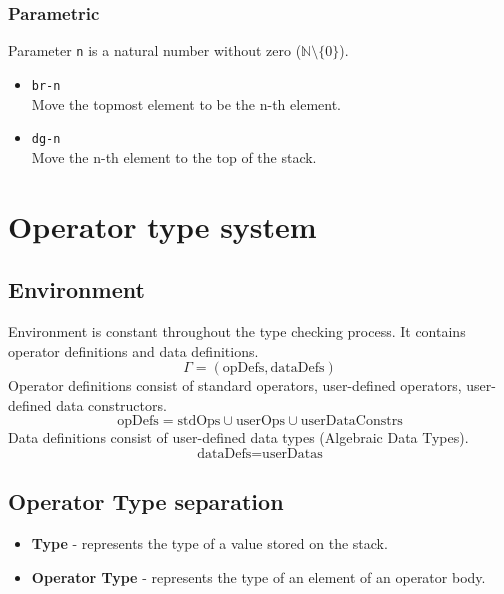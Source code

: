 \documentclass{article}
\begin{document}
\subsubsection*{Parametric}
Parameter \texttt{n} is a natural number without zero ($\mathbb{N}
\setminus \{ 0 \}$).
\begin{itemize}
  \item \texttt{br-n} \\
    Move the topmost element to be the n-th element.
  \item \texttt{dg-n} \\
    Move the n-th element to the top of the stack.
\end{itemize}

\section*{Operator type system}

\subsection*{Environment}
Environment is constant throughout the type checking process. It
contains operator definitions and data definitions.
\begin{equation*}
  \Gamma = (\text{opDefs}, \text{dataDefs})
\end{equation*}
Operator definitions consist of standard operators, user-defined
operators, user-defined data constructors.
\begin{equation*}
  \text{opDefs} = \text{stdOps} \cup \text{userOps} \cup \text{userDataConstrs}
\end{equation*}
Data definitions consist of user-defined data types (Algebraic Data Types).
\begin{equation*}
  \text{dataDefs} = \text{userDatas}
\end{equation*}

\subsection*{Operator Type separation}
\begin{itemize}
  \item \textbf{Type} - represents the type of a value stored on the stack.
  \item \textbf{Operator Type} - represents the type of an element of
    an operator body.
\end{itemize}
\end{document}
